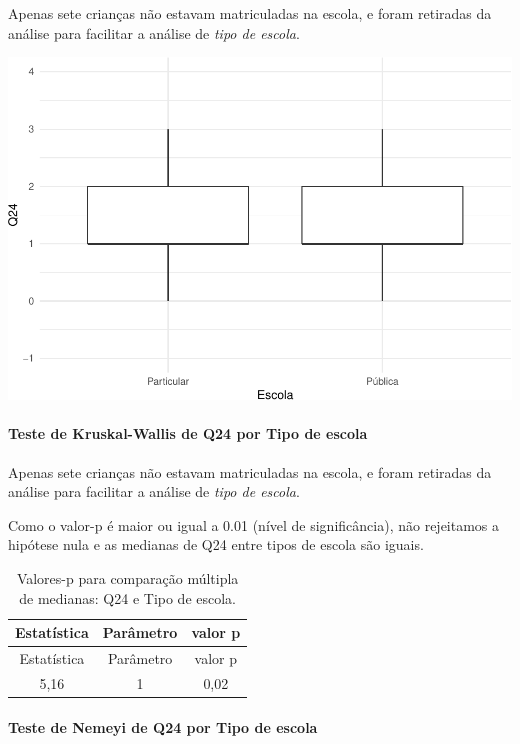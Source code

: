 \documentclass[]{article}
\let\oldparagraph\paragraph
\renewcommand{\paragraph}[1]{\oldparagraph{#1}\mbox{}}
\begin{document}
Apenas sete crianças não estavam matriculadas na escola, e foram retiradas da análise para facilitar a análise de \emph{tipo de escola}.

\begin{center}\includegraphics[width=0.75\linewidth]{relatorio_covid19_files/figure-latex/unnamed-chunk-647-1} \end{center}

\hypertarget{teste-de-kruskal-wallis-de-q24-por-tipo-de-escola}{%
\paragraph{Teste de Kruskal-Wallis de Q24 por Tipo de escola}\label{teste-de-kruskal-wallis-de-q24-por-tipo-de-escola}}

Apenas sete crianças não estavam matriculadas na escola, e foram retiradas da análise para facilitar a análise de \emph{tipo de escola}.

Como o valor-p é maior ou igual a 0.01 (nível de significância), não rejeitamos a hipótese nula e as medianas de Q24 entre tipos de escola são iguais.

\begin{longtable}[]{@{}ccc@{}}
\caption{\label{tab:unnamed-chunk-649}Valores-p para comparação múltipla de medianas: Q24 e Tipo de escola.}\tabularnewline
\toprule
Estatística & Parâmetro & valor p\tabularnewline
\midrule
\endfirsthead
\toprule
Estatística & Parâmetro & valor p\tabularnewline
\midrule
\endhead
5,16 & 1 & 0,02\tabularnewline
\bottomrule
\end{longtable}

\hypertarget{teste-de-nemeyi-de-q24-por-tipo-de-escola}{%
\paragraph{Teste de Nemeyi de Q24 por Tipo de escola}\label{teste-de-nemeyi-de-q24-por-tipo-de-escola}}
\end{document}
